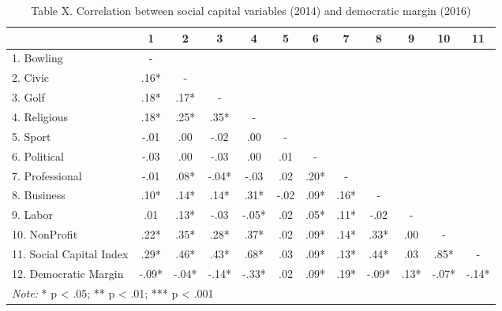 \documentclass[
  english,
  man]{apa6}
\begin{document}
\begin{table}

\caption{\label{tab:regression}Table X. Correlation between social capital variables (2014) and democratic margin (2016)}
\centering
\begin{tabular}[t]{l|c|c|c|c|c|c|c|c|c|c|c}
\hline
  & 1 & 2 & 3 & 4 & 5 & 6 & 7 & 8 & 9 & 10 & 11\\
\hline
1. Bowling & - &  &  &  &  &  &  &  &  &  & \\
\hline
2. Civic & .16* & - &  &  &  &  &  &  &  &  & \\
\hline
3. Golf & .18* & .17* & - &  &  &  &  &  &  &  & \\
\hline
4. Religious & .18* & .25* & .35* & - &  &  &  &  &  &  & \\
\hline
5. Sport & -.01 & .00 & -.02 & .00 & - &  &  &  &  &  & \\
\hline
6. Political & -.03 & .00 & -.03 & .00 & .01 & - &  &  &  &  & \\
\hline
7. Professional & -.01 & .08* & -.04* & -.03 & .02 & .20* & - &  &  &  & \\
\hline
8. Business & .10* & .14* & .14* & .31* & -.02 & .09* & .16* & - &  &  & \\
\hline
9. Labor & .01 & .13* & -.03 & -.05* & .02 & .05* & .11* & -.02 & - &  & \\
\hline
10. NonProfit & .22* & .35* & .28* & .37* & .02 & .09* & .14* & .33* & .00 & - & \\
\hline
11. Social Capital Index & .29* & .46* & .43* & .68* & .03 & .09* & .13* & .44* & .03 & .85* & -\\
\hline
12. Democratic Margin & -.09* & -.04* & -.14* & -.33* & .02 & .09* & .19* & -.09* & .13* & -.07* & -.14*\\
\hline
\multicolumn{12}{l}{\rule{0pt}{1em}\textit{Note: } * p < .05; ** p < .01; *** p < .001}\\
\end{tabular}
\end{table}
\end{document}
